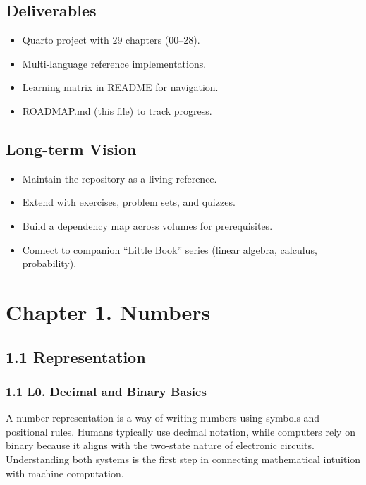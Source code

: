 \documentclass[
  letterpaper,
  DIV=11,
  numbers=noendperiod]{scrreprt}
\providecommand{\tightlist}{%
  \setlength{\itemsep}{0pt}\setlength{\parskip}{0pt}}
\begin{document}
\section{Deliverables}\label{deliverables}

\begin{itemize}
\tightlist
\item
  Quarto project with 29 chapters (00--28).
\item
  Multi-language reference implementations.
\item
  Learning matrix in README for navigation.
\item
  ROADMAP.md (this file) to track progress.
\end{itemize}

\section{Long-term Vision}\label{long-term-vision}

\begin{itemize}
\tightlist
\item
  Maintain the repository as a living reference.
\item
  Extend with exercises, problem sets, and quizzes.
\item
  Build a dependency map across volumes for prerequisites.
\item
  Connect to companion ``Little Book'' series (linear algebra, calculus,
  probability).
\end{itemize}


\chapter{Chapter 1. Numbers}\label{chapter-1.-numbers}

\section{1.1 Representation}\label{representation}

\subsection{1.1 L0. Decimal and Binary
Basics}\label{l0.-decimal-and-binary-basics}

A number representation is a way of writing numbers using symbols and
positional rules. Humans typically use decimal notation, while computers
rely on binary because it aligns with the two-state nature of electronic
circuits. Understanding both systems is the first step in connecting
mathematical intuition with machine computation.
\end{document}
